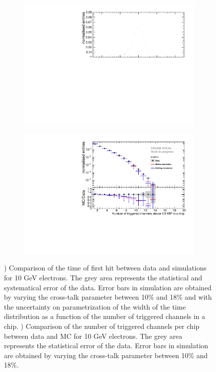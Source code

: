 \documentclass{JINST}
\begin{document}
\begin{figure}[htbp!]
	\centering
	\begin{subfigure}[t]{0.49\textwidth}
		\includegraphics[width=1\textwidth]{fig/Comparison_SimData_Electrons10GeV.pdf}
		\caption{}\label{fig:elec_sim_data_10GeV}
	\end{subfigure}
	\hfill
	\begin{subfigure}[t]{0.49\textwidth}
		\includegraphics[width=1\textwidth]{fig/Comparison_SimData_Electrons_nHits_10GeV.pdf}
		\caption{}\label{fig:elec_sim_data_nHits_10GeV}
	\end{subfigure}
	\caption{) Comparison of the time of first hit between data and simulations for 10 GeV electrons. The grey area represents the statistical and systematical error of the data. Error bars in simulation are obtained by varying the cross-talk parameter between 10\% and 18\% and with the uncertainty on parametrization of the width of the time distribution as a function of the number of triggered channels in a chip. ) Comparison of the number of triggered channels per chip between data and MC for 10 GeV electrons. The grey area represents the statistical error of the data. Error bars in simulation are obtained by varying the cross-talk parameter between 10\% and 18\%.}
\end{figure}
\end{document}
